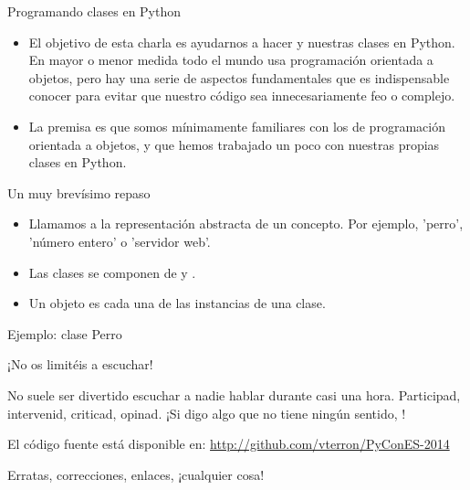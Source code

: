 \begin{frame}{Programando clases en Python}
  \begin{itemize}
    \item El objetivo de esta charla es ayudarnos a hacer
       y  nuestras clases
      en Python. En mayor o menor medida todo el mundo usa
      programación orientada a objetos, pero hay una serie de aspectos
      fundamentales que es indispensable conocer para evitar que
      nuestro código sea innecesariamente feo o complejo.
    \item La premisa es que somos mínimamente familiares con los
       de programación orientada a
      objetos, y que hemos trabajado un poco con nuestras propias
      clases en Python.
  \end{itemize}
\end{frame}

\begin{frame}{Un muy brevísimo repaso}
  \begin{itemize}
    \item Llamamos  a la representación abstracta de un
      concepto. Por ejemplo, 'perro', 'número entero' o 'servidor web'.
    \item Las clases se componen de  y
      .
    \item Un objeto es cada una de las instancias de una clase.
  \end{itemize}
\end{frame}

\begin{frame}{Ejemplo: clase Perro}
\end{frame}

\begin{frame}{¡No os limitéis a escuchar!}
  \begin{center}
    No suele ser divertido escuchar a nadie hablar durante casi una
    hora. Participad, intervenid, criticad, opinad. ¡Si digo algo que
    no tiene ningún sentido, !
  \end{center}

  \begin{block}{\centering El código fuente está disponible en:}
    \centering \url{http://github.com/vterron/PyConES-2014}
  \end{block}

  \begin{center}
    \small Erratas, correcciones, enlaces, ¡cualquier cosa!
  \end{center}
\end{frame}
